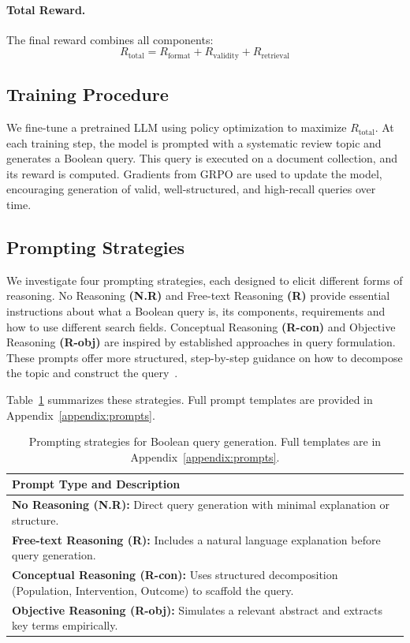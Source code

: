 \paragraph{Total Reward.}
The final reward combines all components: 
\begin{equation}\label{eq:total_reward}
	R_{\text{total}} = R_{\text{format}} + R_{\text{validity}} + R_{\text{retrieval}}
\end{equation}

\subsection{Training Procedure}
We fine-tune a pretrained LLM using policy optimization to maximize \( R_{\text{total}} \). At each training step, the model is prompted with a systematic review topic and generates a Boolean query. This query is executed on a document collection, and its reward is computed. Gradients from GRPO are used to update the model, encouraging generation of valid, well-structured, and high-recall queries over time.

\subsection{Prompting Strategies}
We investigate four prompting strategies, each designed to elicit different forms of reasoning. No Reasoning \textbf{(N.R)} and Free-text Reasoning \textbf{(R)} provide essential instructions about what a Boolean query is, its components, requirements and how to use different search fields. Conceptual Reasoning \textbf{(R-con)} and Objective Reasoning \textbf{(R-obj)} are inspired by established approaches in query formulation. These prompts offer more structured, step-by-step guidance on how to decompose the topic and construct the query~\cite{scells2020objective, scells2020conceptual}.

Table~\ref{tab:prompt-types} summarizes these strategies. Full prompt templates are provided in Appendix~\ref{appendix:prompts}. 

\begin{table}[t]
	\centering
	\footnotesize
	\caption{Prompting strategies for Boolean query generation. Full templates are in Appendix~\ref{appendix:prompts}.}
	\label{tab:prompt-types}

	\begin{tabular}{p{}} %
		\toprule
		\textbf{Prompt Type and Description} \\
		\midrule
		\textbf{No Reasoning (N.R):} Direct query generation with minimal explanation or structure. \\
		\midrule
		\textbf{Free-text Reasoning (R):} Includes a natural language explanation before query generation. \\
		\midrule
		\textbf{Conceptual Reasoning (R-con):} Uses structured decomposition (Population, Intervention, Outcome) to scaffold the query. \\
		\midrule
		\textbf{Objective Reasoning (R-obj):} Simulates a relevant abstract and extracts key terms empirically. \\
		\bottomrule
	\end{tabular}
\end{table}